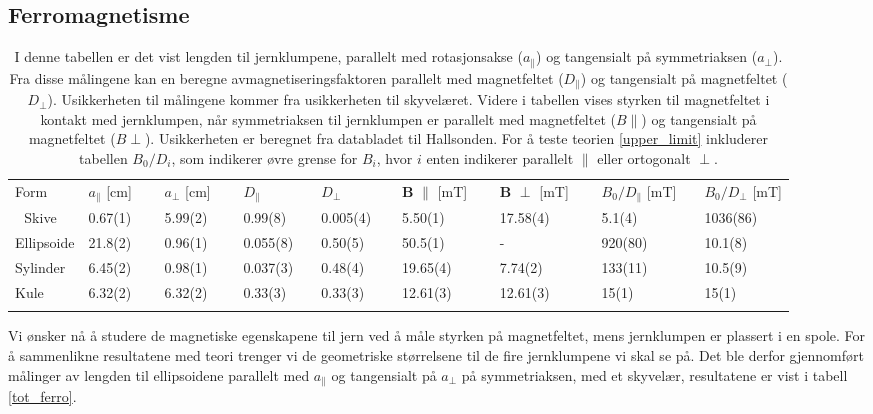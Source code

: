 \documentclass[%
 reprint,
 amsmath,amssymb,
 aps,
 norsk,
]{revtex4-1}
\begin{document}
\subsection{Ferromagnetisme}
\begin{table}\renewcommand{\arraystretch}{1.2}
\centering
\caption{I denne tabellen er det vist lengden til jernklumpene, parallelt med rotasjonsakse ($a_{\parallel}$) og tangensialt på symmetriaksen ($a_{\perp}$). Fra disse målingene kan en beregne avmagnetiseringsfaktoren parallelt med magnetfeltet ($D_{\parallel}$) og tangensialt på magnetfeltet ($D_{\perp}$). Usikkerheten til målingene kommer fra usikkerheten til skyvelæret. Videre i tabellen vises styrken til magnetfeltet i kontakt med jernklumpen, når symmetriaksen til jernklumpen er parallelt med magnetfeltet ($B\parallel$) og tangensialt på magnetfeltet ($B\perp$). Usikkerheten er beregnet fra databladet til Hallsonden. For å teste teorien \eqref{upper_limit} inkluderer tabellen $B_0/D_i$, som indikerer øvre grense for $B_i$, hvor $i$ enten indikerer parallelt $\parallel$ eller ortogonalt $\perp$.}
\label{tot_ferro}
\begin{tabular}{@{}lllllllll@{}}
\botrule
Form & $a_{\parallel}$ {[}cm{]} $\quad$  & $a_{\perp}$ {[}cm{]} $\quad$  & $D_{\parallel}$ $\qquad \quad$ & $D_{\perp}$ $\qquad\quad$ &  $\bm{B}$  $\parallel$ {[}mT{]} $\quad$ & $\bm{B}$ $\perp$ {[}mT{]} $\quad$ & $B_0/D_{\parallel}$ [mT]$\quad$  & $B_0/D_{\perp}$ [mT]\\ \colrule 
Skive      & 0.67(1)        & 5.99(2)           & 0.99(8)         & 0.005(4) & 5.50(1)                           & 17.58(4)         &    5.1(4)  &  1036(86)      \\
Ellipsoide & 21.8(2)        & 0.96(1)           & 0.055(8)        & 0.50(5) & 50.5(1)                           & -                &   920(80)    & 10.1(8)       \\
Sylinder   & 6.45(2)        & 0.98(1)           & 0.037(3)        & 0.48(4) & 19.65(4)                          & 7.74(2)          &   133(11)    &10.5(9)           \\
Kule       & 6.32(2)        & 6.32(2)           & 0.33(3)         & 0.33(3) & 12.61(3)            & 12.61(3)                &   15(1)  & 15(1)        \\ \botrule
\end{tabular}
\end{table}
Vi ønsker nå å studere de magnetiske egenskapene til jern ved å måle styrken på magnetfeltet, mens jernklumpen er plassert i en spole. For å sammenlikne resultatene med teori trenger vi de geometriske størrelsene til de fire jernklumpene vi skal se på. Det ble derfor gjennomført målinger av lengden til ellipsoidene parallelt med $a_{\parallel}$ og tangensialt på $a_{\perp}$ på symmetriaksen, med et skyvelær, resultatene er vist  i tabell \vref{tot_ferro}.
\end{document}
